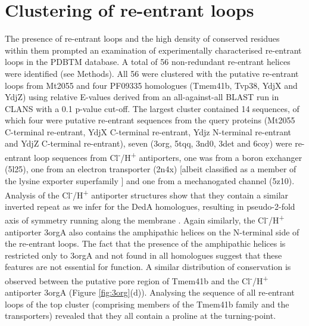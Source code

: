 \section{Clustering of re-entrant loops}
The presence of re-entrant loops and the high density of conserved residues within them prompted an examination of experimentally characterised re-entrant loops in the PDBTM database. A total of 56 non-redundant re-entrant helices were identified (see Methods). All 56 were clustered with the putative re-entrant loops from Mt2055 and four PF09335 homologues (Tmem41b, Tvp38, YdjX and YdjZ) using relative E-values derived from an all-against-all BLAST run in CLANS \cite{Frickey2004} with a 0.1 p-value cut-off. The largest cluster contained 14 sequences, of which four were putative re-entrant sequences from the query proteins (Mt2055 C-terminal re-entrant, YdjX C-terminal re-entrant, Ydjz N-terminal re-entrant and YdjZ C-terminal re-entrant), seven (3org, 5tqq, 3nd0, 3det and 6coy) were re-entrant loop sequences from Cl\textsuperscript{-}/H\textsuperscript{+} antiporters, one was from a boron exchanger (5l25), one from an electron transporter (2n4x) [albeit classified as a member of the lysine exporter superfamily \cite{Saier2016}] and one from a mechanogated channel (5z10).\\

Analysis of the Cl\textsuperscript{-}/H\textsuperscript{+} antiporter structures show that they contain a similar inverted repeat as we infer for the DedA homologues, resulting in pseudo-2-fold axis of symmetry running along the membrane \cite{Duran2013}. Again similarly, the Cl\textsuperscript{-}/H\textsuperscript{+} antiporter 3orgA also contains the amphipathic helices on the N-terminal side of the re-entrant loops. The fact that the presence of the amphipathic helices is restricted only to 3orgA and not found in all homologues suggest that these features are not essential for function. A similar distribution of conservation is observed between the putative pore region of Tmem41b and the Cl\textsuperscript{-}/H\textsuperscript{+} antiporter 3orgA (Figure \ref{fig:3org}(d)). Analysing the sequence of all re-entrant loops of the top cluster (comprising members of the Tmem41b family and the transporters) revealed that they all contain a proline at the turning-point. \\

 
 
